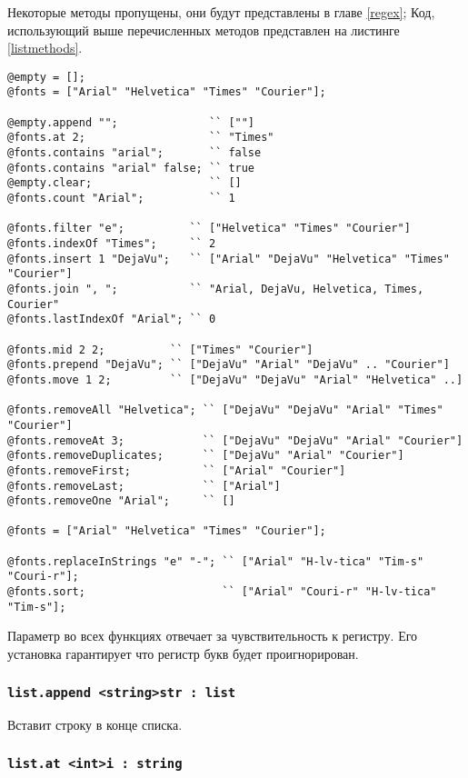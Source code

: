 \documentclass[a4paper, 14pt]{extarticle}
\begin{document}
Некоторые методы пропущены, они будут представлены в главе \ref{regex}; Код, использующий выше перечисленных методов представлен на листинге \ref{listmethods}. 

\begin{lstlisting}[caption=Методы класса list, label=listmethods]
@empty = [];
@fonts = ["Arial" "Helvetica" "Times" "Courier"];

@empty.append "";              `` [""]
@fonts.at 2;                   `` "Times"
@fonts.contains "arial";       `` false
@fonts.contains "arial" false; `` true
@empty.clear;                  `` []
@fonts.count "Arial";          `` 1

@fonts.filter "e";          `` ["Helvetica" "Times" "Courier"]
@fonts.indexOf "Times";     `` 2
@fonts.insert 1 "DejaVu";   `` ["Arial" "DejaVu" "Helvetica" "Times" "Courier"]
@fonts.join ", ";           `` "Arial, DejaVu, Helvetica, Times, Courier"
@fonts.lastIndexOf "Arial"; `` 0

@fonts.mid 2 2;          `` ["Times" "Courier"]
@fonts.prepend "DejaVu"; `` ["DejaVu" "Arial" "DejaVu" .. "Courier"]
@fonts.move 1 2;         `` ["DejaVu" "DejaVu" "Arial" "Helvetica" ..]

@fonts.removeAll "Helvetica"; `` ["DejaVu" "DejaVu" "Arial" "Times" "Courier"]
@fonts.removeAt 3;            `` ["DejaVu" "DejaVu" "Arial" "Courier"]
@fonts.removeDuplicates;      `` ["DejaVu" "Arial" "Courier"]
@fonts.removeFirst;           `` ["Arial" "Courier"]
@fonts.removeLast;            `` ["Arial"]
@fonts.removeOne "Arial";     `` []

@fonts = ["Arial" "Helvetica" "Times" "Courier"];

@fonts.replaceInStrings "e" "-"; `` ["Arial" "H-lv-tica" "Tim-s" "Couri-r"];
@fonts.sort;                     `` ["Arial" "Couri-r" "H-lv-tica" "Tim-s"];
\end{lstlisting}

Параметр  во всех функциях отвечает за чувствительность к регистру. Его установка гарантирует что регистр букв будет проигнорирован.

\subsubsection{\lstinline|list.append <string>str : list|}

Вставит строку  в конце списка.

\subsubsection{\lstinline|list.at <int>i : string|}
\end{document}
